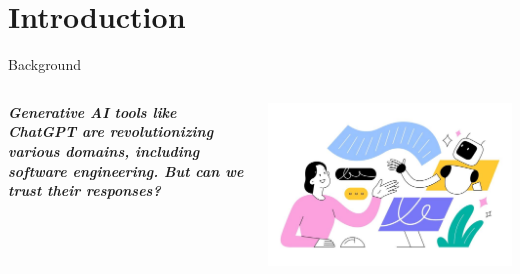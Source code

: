 \section{Introduction}



\begin{frame}{Background}
    \begin{columns}
        \textbf{\textit{Generative AI tools like ChatGPT are revolutionizing various domains, including software engineering. But can we trust their responses?}}
        
        \includegraphics[width=\textwidth]{image2.jpg}
    \end{columns}
\end{frame}

